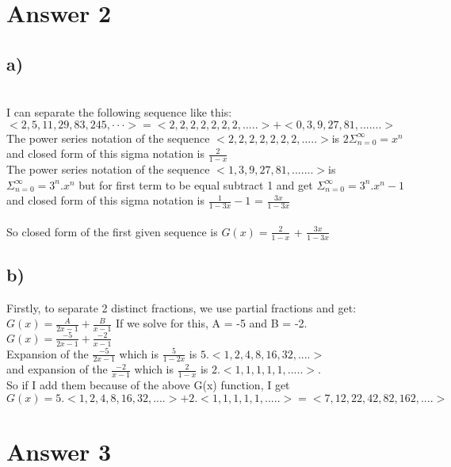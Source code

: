 \documentclass[12pt]{article}
\begin{document}
\section*{Answer 2}
\subsection*{a) }\\
I can separate the following sequence like this:\\
$<2, 5, 11, 29, 83, 245, · · ·> = <2,2,2,2,2,2,2,.....> + <0,3,9,27,81,.......>$\\
The power series notation of the sequence $<2,2,2,2,2,2,2,.....> $is $2\Sigma_{n=0}^\infty = x^n$\\
and closed form of this sigma notation is $\frac{2}{1-x}$\\
The power series notation of the sequence $<1,3,9,27,81,.......> $is $\Sigma_{n=0}^\infty = 3^n.x^n$ but for first term to be equal subtract 1 and
get $\Sigma_{n=0}^\infty = 3^n.x^n -1$ and closed form of this sigma notation is $\frac{1}{1-3x}-1$ = $\frac{3x}{1-3x}$\\
\\
So closed form of the first given sequence is $G(x) = \frac{2}{1-x}$ + $\frac{3x}{1-3x}$\\

\subsection*{b) }
Firstly, to separate 2 distinct fractions, we use partial fractions and get:\\
$G(x) = \frac{A}{2x-1}+\frac{B}{x-1}$ If we solve for this, A = -5 and B = -2.\\
$G(x) = \frac{-5}{2x-1}+\frac{-2}{x-1}$\\
Expansion of the $\frac{-5}{2x-1}$ which is $\frac{5}{1-2x}$ is $5.<1,2,4,8,16,32,....>$\\
and expansion of the $\frac{-2}{x-1}$ which is $\frac{2}{1-x}$ is $2.<1,1,1,1,1,.....>$.\\
So if I add them because of the above G(x) function, I get\\
$G(x) = 5.<1,2,4,8,16,32,....> + 2.<1,1,1,1,1,.....> = <7,12,22,42,82,162,....>$\\

\section*{Answer 3}
\end{document}
